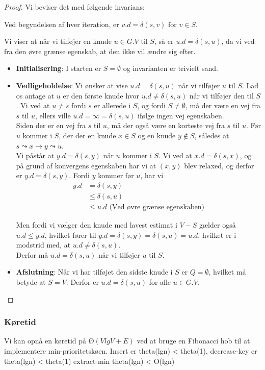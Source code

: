 \begin{proof}
  Vi beviser det med følgende invarians:\\
  \begin{center}
    Ved begyndelsen af hver iteration, er $v.d = \delta(s,v)$ for $v \in S$.
  \end{center}

  Vi viser at når vi tilføjer en knude $u \in G.V$ til $S$, så er $u.d = \delta(s,u)$, da vi ved fra den øvre grænse egenskab, at den ikke vil ændre sig efter.\\

  \begin{itemize}
  \item \textbf{Initialisering}: I starten er $S=\emptyset$ og invarianten er trivielt sand.
  \item \textbf{Vedligeholdelse}: Vi ønsker at vise $u.d = \delta(s,u)$ når vi tilføjer $u$ til $S$. Lad os antage at $u$ er den første knude hvor $u.d \neq \delta(s,u)$ når vi tilføjer den til $S$. Vi ved at $u \neq s$ fordi $s$ er allerede i $S$, og fordi $S \neq \emptyset$, må der være en vej fra $s$ til $u$, ellers ville $u.d = \infty = \delta(s,u)$ ifølge ingen vej egenskaben.\\

    Siden der er en vej fra $s$ til $u$, må der også være en korteste vej fra $s$ til $u$. Før $u$ kommer i $S$, der der en knude $x \in S$ og en knude $y \not\in S$, således at $s \leadsto x \rightarrow y \leadsto u$.\\
    Vi påstår at $y.d = \delta(s,y)$ når $u$ kommer i $S$. Vi ved at $x.d = \delta(s,x)$, og på grund af konvergens egenskaben har vi at $(x,y)$ blev relaxed, og derfor er $y.d = \delta(s,y)$. Fordi $y$ kommer før $u$, har vi
    \begin{align*}
      y.d &= \delta(s,y)\\
          &\leq \delta(s,u)\\
          &\leq u.d \text{ (Ved øvre grænse egenskaben)}
    \end{align*}

    Men fordi vi vælger den knude med lavest estimat i $V-S$ gælder også $u.d \leq y.d$, hvilket fører til $y.d = \delta(s,y) = \delta(s,u) = u.d$, hvilket er i modstrid med, at $u.d \neq \delta(s,u)$.\\
    Derfor må $u.d = \delta(s,u)$ når vi tilføjer $u$ til $S$.
    \item \textbf{Afslutning}: Når vi har tilføjet den sidste knude i $S$ er $Q=\emptyset$, hvilket må betyde at $S = V$. Derfor er $u.d = \delta(s,u)$ for alle $u \in G.V$.
  \end{itemize}
\end{proof}

\subsubsection{Køretid}
Vi kan opnå en køretid på $Ø(VlgV + E)$ ved at bruge en Fibonacci hob til at implementere min-prioritetskøen. Insert er theta(lgn) < theta(1), decrease-key er theta(lgn) < theta(1) extract-min theta(lgn) < O(lgn)
